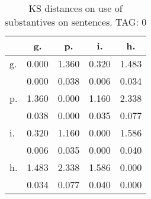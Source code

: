 \begin{table}[h!]
\begin{center}
\begin{tabular}{| l | c | c | c | c |}\hline
 & g. & p. & i. & h. \\\hline
g. & 0.000  & 1.360  & 0.320  & 1.483 \\\hline
 & 0.000  & 0.038  & 0.006  & 0.034 \\\hline
p. & 1.360  & 0.000  & 1.160  & 2.338 \\\hline
 & 0.038  & 0.000  & 0.035  & 0.077 \\\hline
i. & 0.320  & 1.160  & 0.000  & 1.586 \\\hline
 & 0.006  & 0.035  & 0.000  & 0.040 \\\hline
h. & 1.483  & 2.338  & 1.586  & 0.000 \\\hline
 & 0.034  & 0.077  & 0.040  & 0.000 \\\hline
\end{tabular}
\caption{KS distances on use of substantives on sentences. TAG: 0}
\end{center}
\end{table}